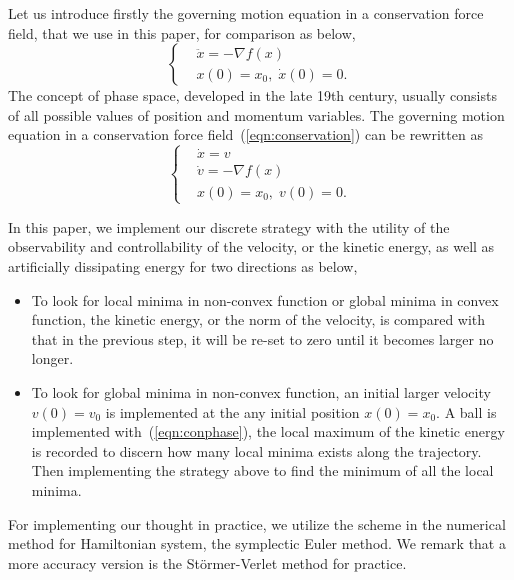 \documentclass[11pt,fceqn]{article}
\numberwithin{equation}{section}
\theoremstyle{definition}
\begin{document}
Let us introduce firstly the governing motion equation in a conservation force field, that we use in this paper, for comparison as below, 
\begin{equation}
\label{eqn:conservation}
\left\{\begin{aligned}
& \ddot{x} = - \nabla f(x) \\
&  x(0)= x_{0}, \;\dot{x}(0) =0. 
\end{aligned}\right.
\end{equation}
The concept of phase space, developed in the late 19th century, usually consists of all possible values of position and momentum variables. The governing motion equation in a conservation force field~(\ref{eqn:conservation}) can be rewritten as
\begin{equation}
\label{eqn:conphase}
\left\{\begin{aligned}
& \dot{x} = v \\
& \dot{v} = -\nabla f(x) \\
&  x(0)= x_{0}, \;v(0) =0 .
\end{aligned}\right.
\end{equation}

In this paper, we implement our discrete strategy with the utility of the observability and controllability of the velocity, or the kinetic energy, as well as artificially dissipating energy for two directions as below,   
\begin{itemize}
\item To look for local minima in non-convex function or global minima in convex function, the kinetic energy, or the norm of the velocity, is compared with that in the previous step,  it will be re-set to zero until it becomes larger no longer. 

\item To look for global minima in non-convex function, an initial larger velocity $v(0) = v_{0}$ is implemented at the any initial position $x(0) = x_{0}$. A ball is implemented with~(\ref{eqn:conphase}), the local maximum of the kinetic energy  is recorded to discern how many local minima exists along the trajectory. Then implementing the strategy above to find the minimum of all the local minima.
\end{itemize}
For implementing our thought in practice, we utilize the scheme in the numerical method for Hamiltonian system, the symplectic Euler method. We remark that a more accuracy version is the St\"{o}rmer-Verlet method for practice. 

\end{document}
